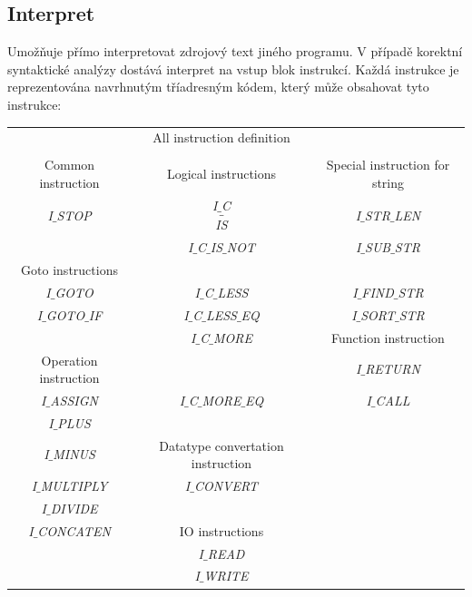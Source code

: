 \documentclass[11pt,a4paper,titlepage]{article}
\begin{document}
	\subsection{Interpret}
	\bigskip
   	\hspace{1cm} Umožňuje přímo interpretovat zdrojový text jiného programu. V případě korektní syntaktické analýzy dostává interpret na vstup blok instrukcí. Každá instrukce je reprezentována navrhnutým tříadresným kódem, který může obsahovat tyto instrukce: \\
   	\smallskip
			\begin{center}
  		\begin{tabular}{c c c}
  												& All instruction definition &                      \\
  												&                         &                       \\
  		Common instruction  & Logical instructions		& Special instruction for string \\                
   		 	\emph{I$\_$STOP}		&		\emph{I$\_$C$$\_$$IS}				&		\emph{I$\_$STR$\_$LEN}		\\
   	                      &   \emph{I$\_$C$\_$IS$\_$NOT}  &		\emph{I$\_$SUB$\_$STR}		\\
			 Goto instructions  &  	                      &                         \\
   			\emph{I$\_$GOTO}		&		\emph{I$\_$C$\_$LESS}			&		\emph{I$\_$FIND$\_$STR}		\\
   			\emph{I$\_$GOTO$\_$IF}&		\emph{I$\_$C$\_$LESS$\_$EQ}	&		\emph{I$\_$SORT$\_$STR}		\\
   	                      & 	\emph{I$\_$C$\_$MORE}			&	Function instruction		\\
		 Operation instruction&													&		\emph{I$\_$RETURN}			\\
			  \emph{I$\_$ASSIGN}	&		\emph{I$\_$C$\_$MORE$\_$EQ}	&		\emph{I$\_$CALL}				\\
   		   \emph{I$\_$PLUS}   &                         &                         \\
				\emph{I$\_$MINUS}   & Datatype convertation instruction &								\\	
   		 \emph{I$\_$MULTIPLY} &		\emph{I$\_$CONVERT}			&													\\ 	
   			\emph{I$\_$DIVIDE}	&	                                                  \\
			 \emph{I$\_$CONCATEN} &	IO instructions					&													\\
   	 	 										&		\emph{I$\_$READ}				&													\\
   											  &	 	\emph{I$\_$WRITE}				&													\\
   		\end{tabular}
			\end{center}
		 	
\end{document}
